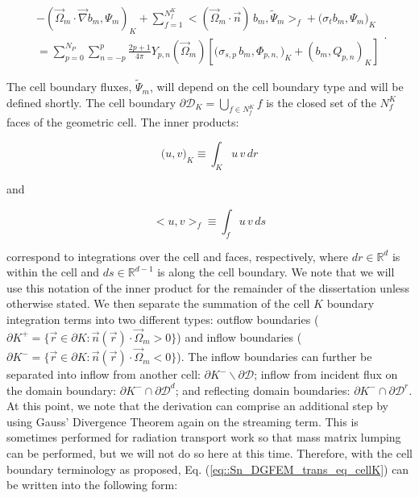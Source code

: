 \begin{equation}
\label{eq::Sn_DGFEM_trans_eq_cellK}
\begin{aligned}
- \left( \vec{\Omega}_m \cdot  \vec{\nabla} b_m, \Psi_{m} \right)_{K} + \sum_{f=1}^{N_f^K} \Big< ( \vec{\Omega}_m \cdot \vec{n} ) \, b_m, \tilde{\Psi}_m  \Big>_{f}  + \Big(  \sigma_{t} b_m ,   \Psi_{m} \Big)_{K} \\
= \sum_{p=0}^{N_P} \sum_{n=-p}^{p} \frac{2p + 1}{4 \pi}  Y_{p,n} (  \vec{\Omega}_m ) \left[ \Big( \sigma_{s,p} \, b_m,  \Phi_{p,n,} \Big)_{K}  + \left(  b_m ,   Q_{p,n} \right)_{K} \right]
\end{aligned} .
\end{equation}

\noindent The cell boundary fluxes, $\tilde{\Psi}_m$, will depend on the cell boundary type and will be defined shortly. The cell boundary $\partial \mathcal{D}_K = \bigcup_{ f \in N_f^K} f$ is the closed set of the $N_f^K$ faces of the geometric cell. The inner products:

\begin{equation}
\label{eq::Sn_spatial_inner_products_cell}
 \Big( u, v \Big)_K \equiv \int_K u \, v \, d r
\end{equation} 

\noindent and

\begin{equation}
\label{eq::Sn_spatial_inner_products_face}
 \Big< u, v \Big>_f \equiv \int_f u \, v \, d s
\end{equation}

\noindent correspond to integrations over the cell and faces, respectively, where $dr \in \mathbb{R}^d$ is within the cell and $ds \in \mathbb{R}^{d-1}$ is along the cell boundary. We note that we will use this notation of the inner product for the remainder of the dissertation unless otherwise stated. We then separate the summation of the cell $K$ boundary integration terms into two different types: outflow boundaries ($\partial K^+ = \{  \vec{r} \in \partial K: \vec{n} (\vec{r}) \cdot \vec{\Omega}_m > 0 \}$) and inflow boundaries ($\partial K^- = \{  \vec{r} \in \partial K: \vec{n} (\vec{r}) \cdot \vec{\Omega}_m < 0 \}$). The inflow boundaries can further be separated into inflow from another cell: $\partial K^- \backslash \partial \mathcal{D} $; inflow from incident flux on the domain boundary: $\partial K^- \cap \partial \mathcal{D}^d $; and reflecting domain boundaries: $\partial K^- \cap \partial \mathcal{D}^r $. At this point, we note that the derivation can comprise an additional step by using Gauss' Divergence Theorem again on the streaming term. This is sometimes performed for radiation transport work so that mass matrix lumping can be performed, but we will not do so here at this time. Therefore, with the cell boundary terminology as proposed, Eq. (\ref{eq::Sn_DGFEM_trans_eq_cellK}) can be written into the following form:

